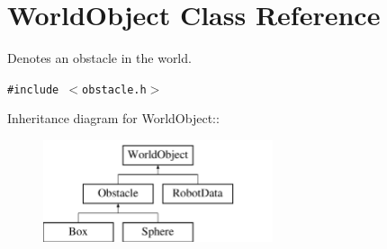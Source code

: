 \hypertarget{class_world_object}{
\section{WorldObject Class Reference}
\label{class_world_object}
}
Denotes an obstacle in the world.  


{\tt \#include $<$obstacle.h$>$}

Inheritance diagram for WorldObject::\begin{figure}[H]
\begin{center}
\leavevmode
\includegraphics[height=3cm]{class_world_object}
\end{center}
\end{figure}
